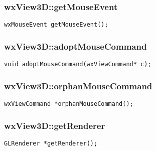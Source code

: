 \documentclass[12pt]{article}
\begin{document}
\subsubsection*{wxView3D::getMouseEvent}
\vspace{-0.65cm}
\hrulefill
{}
\begin{flushleft}
\texttt{wxMouseEvent getMouseEvent();}
\end{flushleft}



\subsubsection*{wxView3D::adoptMouseCommand}
\vspace{-0.65cm}
\hrulefill
{}
\begin{flushleft}
\texttt{void adoptMouseCommand(wxViewCommand* c);}
\end{flushleft}



\subsubsection*{wxView3D::orphanMouseCommand}
\vspace{-0.65cm}
\hrulefill
{}
\begin{flushleft}
\texttt{wxViewCommand *orphanMouseCommand();}
\end{flushleft}



\subsubsection*{wxView3D::getRenderer}
\vspace{-0.65cm}
\hrulefill
{}
\begin{flushleft}
\texttt{GLRenderer *getRenderer();}
\end{flushleft}



\printindex
\end{document}
